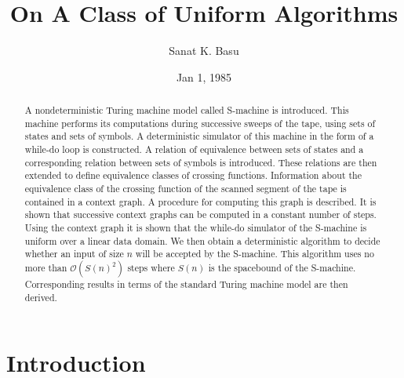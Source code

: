 \documentclass{article}
\title{On A Class of Uniform Algorithms}
\author{Sanat K. Basu}
\date{Jan 1, 1985}
\begin{document}
\newcommand\bigO[1]{$\mathcal{O}(#1)$}
\newcommand\cancelb{\cancel{b}}
\newcommand\cancelc{\cancel{c}}
\newcommand{\suchthat}{\ni}
\newenvironment{aside}
{\begin{mdframed}[leftline=false, rightline=false, leftmargin=2em, rightmargin=2em,
    innerleftmargin=0pt, innerrightmargin=0pt, linewidth=0.75pt,skipabove=7pt, skipbelow=7pt]\small}
{\end{mdframed}}

\newenvironment{error}
{\begin{mdframed}[backgroundcolor=red!10, leftline=false, rightline=false, leftmargin=2em, rightmargin=2em,
    innerleftmargin=0pt, innerrightmargin=0pt, linewidth=0.75pt,skipabove=7pt, skipbelow=7pt]\small}
{\end{mdframed}}

\newtheorem{theorem}{Theorem}
\newtheorem{lemma}[theorem]{Lemma}

\maketitle
\begin{abstract}
A nondeterministic Turing machine model called S-machine is introduced.
This machine performs its computations during successive sweeps of the tape, using sets of states and sets of symbols.
A deterministic simulator of this machine in the form of a while-do loop is constructed.
A relation of equivalence between sets of states and a corresponding relation between sets of symbols is introduced.
These relations are then extended to define equivalence classes of crossing functions.
Information about the equivalence class of the crossing function of the scanned segment of the tape is contained
in a context graph.
A procedure for computing this graph is described.
It is shown that successive context graphs can be computed in a constant number of 
steps.
Using the context graph it is shown that the while-do simulator of the S-machine
is uniform over a linear data domain.
We then obtain a deterministic algorithm to
decide whether an input of size $n$ will be accepted by the S-machine.
This algorithm uses no more than \bigO{S(n)^2} steps where $S(n)$ is the spacebound
of the S-machine.
Corresponding results in terms of the standard Turing machine model are then derived.
\end{abstract}

\section{Introduction}\label{sec:introduction}

\end{document}
